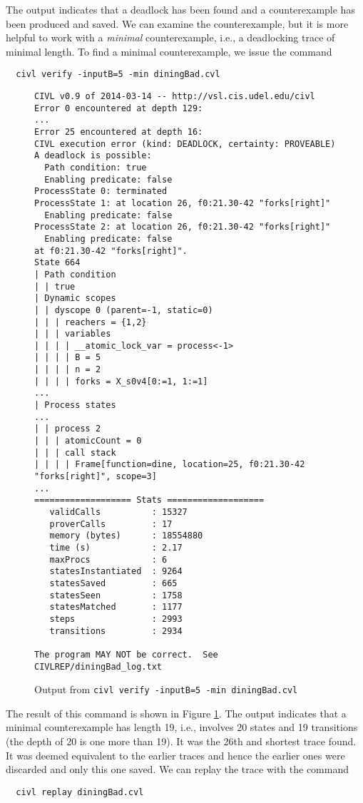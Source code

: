 The output indicates that a deadlock has been found and a
counterexample has been produced and saved. We can examine the
counterexample, but it is more helpful to work with a \emph{minimal}
counterexample, i.e., a deadlocking trace of minimal length. To find a
minimal counterexample, we issue the command

\begin{verbatim}
  civl verify -inputB=5 -min diningBad.cvl
\end{verbatim}

\begin{figure}[t]
  \begin{small}
\begin{verbatim}
CIVL v0.9 of 2014-03-14 -- http://vsl.cis.udel.edu/civl
Error 0 encountered at depth 129:
...
Error 25 encountered at depth 16:
CIVL execution error (kind: DEADLOCK, certainty: PROVEABLE)
A deadlock is possible:
  Path condition: true
  Enabling predicate: false
ProcessState 0: terminated
ProcessState 1: at location 26, f0:21.30-42 "forks[right]"
  Enabling predicate: false
ProcessState 2: at location 26, f0:21.30-42 "forks[right]"
  Enabling predicate: false
at f0:21.30-42 "forks[right]".
State 664
| Path condition
| | true
| Dynamic scopes
| | dyscope 0 (parent=-1, static=0)
| | | reachers = {1,2}
| | | variables
| | | | __atomic_lock_var = process<-1>
| | | | B = 5
| | | | n = 2
| | | | forks = X_s0v4[0:=1, 1:=1]
...
| Process states
...
| | process 2
| | | atomicCount = 0
| | | call stack
| | | | Frame[function=dine, location=25, f0:21.30-42 "forks[right]", scope=3]
...
=================== Stats ===================
   validCalls          : 15327
   proverCalls         : 17
   memory (bytes)      : 18554880
   time (s)            : 2.17
   maxProcs            : 6
   statesInstantiated  : 9264
   statesSaved         : 665
   statesSeen          : 1758
   statesMatched       : 1177
   steps               : 2993
   transitions         : 2934

The program MAY NOT be correct.  See CIVLREP/diningBad_log.txt
\end{verbatim}
  \end{small}
  \caption{Output from \texttt{civl verify -inputB=5 -min diningBad.cvl}}
  \label{fig:diningOut}
\end{figure}

The result of this command is shown in Figure \ref{fig:diningOut}. The
output indicates that a minimal counterexample has length 19, i.e.,
involves 20 states and 19 transitions (the depth of 20 is one more
than 19).    It was the 26th and shortest trace found.  It was deemed
equivalent to the earlier traces and hence the earlier ones were
discarded and only this one saved.  We can replay the trace with the command
\begin{verbatim}
  civl replay diningBad.cvl
\end{verbatim}

